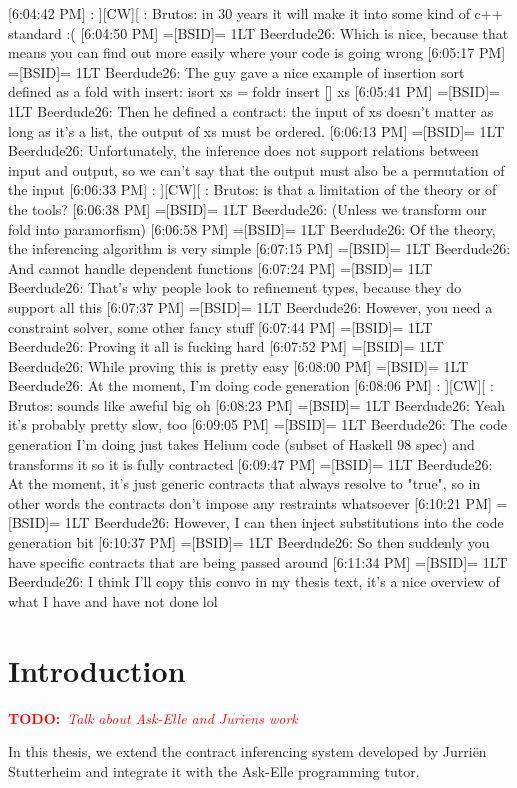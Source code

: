 \documentclass[10pt,a4paper]{article}
\newcommand{\annotate}[3]{
	\begin{scriptsize}
	\textcolor{#1}{\textbf{#2}~\textit{#3}}
	\end{scriptsize}\newline}
\newcommand{\todo}[1]{\annotate{red} {TODO:} {#1}}
\begin{document}
[6:04:42 PM] : ][CW][ : Brutos: in 30 years it will make it into some kind of c++ standard :(
[6:04:50 PM] =[BSID]= 1LT Beerdude26: Which is nice, because that means you can find out more easily where your code is going wrong
[6:05:17 PM] =[BSID]= 1LT Beerdude26: The guy gave a nice example of insertion sort defined as a fold with insert: isort xs = foldr insert [] xs
[6:05:41 PM] =[BSID]= 1LT Beerdude26: Then he defined a contract: the input of xs doesn't matter as long as it's a list, the output of xs must be ordered.
[6:06:13 PM] =[BSID]= 1LT Beerdude26: Unfortunately, the inference does not support relations between input and output, so we can't say that the output must also be a permutation of the input
[6:06:33 PM] : ][CW][ : Brutos: is that a limitation of the theory or of the tools?
[6:06:38 PM] =[BSID]= 1LT Beerdude26: (Unless we transform our fold into paramorfism)
[6:06:58 PM] =[BSID]= 1LT Beerdude26: Of the theory, the inferencing algorithm is very simple
[6:07:15 PM] =[BSID]= 1LT Beerdude26: And cannot handle dependent functions
[6:07:24 PM] =[BSID]= 1LT Beerdude26: That's why people look to refinement types, because they do support all this
[6:07:37 PM] =[BSID]= 1LT Beerdude26: However, you need a constraint solver, some other fancy stuff
[6:07:44 PM] =[BSID]= 1LT Beerdude26: Proving it all is fucking hard
[6:07:52 PM] =[BSID]= 1LT Beerdude26: While proving this is pretty easy
[6:08:00 PM] =[BSID]= 1LT Beerdude26: At the moment, I'm doing code generation
[6:08:06 PM] : ][CW][ : Brutos: sounds like aweful big oh
[6:08:23 PM] =[BSID]= 1LT Beerdude26: Yeah it's probably pretty slow, too
[6:09:05 PM] =[BSID]= 1LT Beerdude26: The code generation I'm doing just takes Helium code (subset of Haskell 98 spec) and transforms it so it is fully contracted
[6:09:47 PM] =[BSID]= 1LT Beerdude26: At the moment, it's just generic contracts that always resolve to "true", so in other words the contracts don't impose any restraints whatsoever
[6:10:21 PM] =[BSID]= 1LT Beerdude26: However, I can then inject substitutions into the code generation bit
[6:10:37 PM] =[BSID]= 1LT Beerdude26: So then suddenly you have specific contracts that are being passed around
[6:11:34 PM] =[BSID]= 1LT Beerdude26: I think I'll copy this convo in my thesis text, it's a nice overview of what I have and have not done lol

\tableofcontents

\section{Introduction}
\todo{Talk about Ask-Elle and Juriens work}
In this thesis, we extend the contract inferencing system developed by Jurri\"en Stutterheim and integrate it with the Ask-Elle programming tutor.
\end{document}
